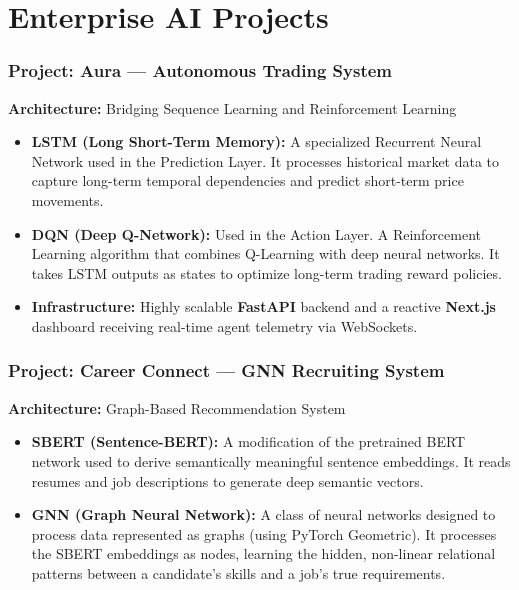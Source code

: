 \documentclass[aspectratio=169]{beamer}
\begin{document}
\section{Enterprise AI Projects}
\begin{frame}
\frametitle{Project: Aura — Autonomous Trading System}
\textbf{Architecture:} Bridging Sequence Learning and Reinforcement Learning
\vspace{0.3cm}
\begin{itemize}
    \item \textbf{LSTM (Long Short-Term Memory):} A specialized Recurrent Neural Network used in the Prediction Layer. It processes historical market data to capture long-term temporal dependencies and predict short-term price movements.
    \item \textbf{DQN (Deep Q-Network):} Used in the Action Layer. A Reinforcement Learning algorithm that combines Q-Learning with deep neural networks. It takes LSTM outputs as states to optimize long-term trading reward policies.
    \item \textbf{Infrastructure:} Highly scalable \textbf{FastAPI} backend and a reactive \textbf{Next.js} dashboard receiving real-time agent telemetry via WebSockets.
\end{itemize}
\end{frame}

\begin{frame}
\frametitle{Project: Career Connect — GNN Recruiting System}
\textbf{Architecture:} Graph-Based Recommendation System
\vspace{0.3cm}
\begin{itemize}
    \item \textbf{SBERT (Sentence-BERT):} A modification of the pretrained BERT network used to derive semantically meaningful sentence embeddings. It reads resumes and job descriptions to generate deep semantic vectors.
    \item \textbf{GNN (Graph Neural Network):} A class of neural networks designed to process data represented as graphs (using PyTorch Geometric). It processes the SBERT embeddings as nodes, learning the hidden, non-linear relational patterns between a candidate's skills and a job's true requirements.
\end{itemize}
\end{frame}
\end{document}
